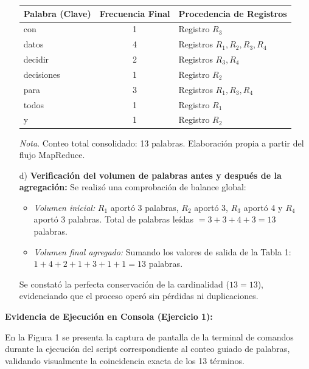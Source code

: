 \documentclass[12pt,a4paper]{article}
\begin{document}
\begin{enumerate}
\begin{center}
    \begin{tabular}{lcl}
        \toprule
        \textbf{Palabra (Clave)} & \textbf{Frecuencia Final} & \textbf{Procedencia de Registros} \\
        \midrule
        con & 1 & Registro $R_3$ \\
        datos & 4 & Registros $R_1, R_2, R_3, R_4$ \\
        decidir & 2 & Registros $R_3, R_4$ \\
        decisiones & 1 & Registro $R_2$ \\
        para & 3 & Registros $R_1, R_3, R_4$ \\
        todos & 1 & Registro $R_1$ \\
        y & 1 & Registro $R_2$ \\
        \bottomrule
    \end{tabular}
    \vspace{3pt}
    
    \raggedright\footnotesize\textit{Nota}. Conteo total consolidado: 13 palabras. Elaboración propia a partir del flujo MapReduce.
    \end{center}

    \item[d)] \textbf{Verificación del volumen de palabras antes y después de la agregación:}
    Se realizó una comprobación de balance global:
    \begin{itemize}
        \item \textit{Volumen inicial:} $R_1$ aportó 3 palabras, $R_2$ aportó 3, $R_3$ aportó 4 y $R_4$ aportó 3 palabras. Total de palabras leídas $= 3 + 3 + 4 + 3 = 13$ palabras.
        \item \textit{Volumen final agregado:} Sumando los valores de salida de la Tabla 1:
        $1 + 4 + 2 + 1 + 3 + 1 + 1 = 13$ palabras.
    \end{itemize}
    Se constató la perfecta conservación de la cardinalidad ($13 = 13$), evidenciando que el proceso operó sin pérdidas ni duplicaciones.
\end{enumerate}

\vspace{0.2cm}
\noindent\textbf{Evidencia de Ejecución en Consola (Ejercicio 1):}

En la Figura 1 se presenta la captura de pantalla de la terminal de comandos durante la ejecución del script correspondiente al conteo guiado de palabras, validando visualmente la coincidencia exacta de los 13 términos.
\end{document}
